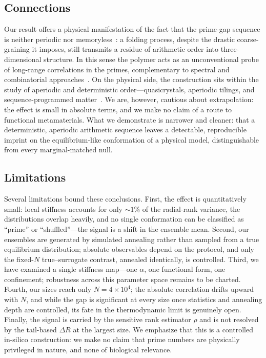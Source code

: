 \documentclass[11pt]{article}
\begin{document}
\subsection{Connections}
Our result offers a physical manifestation of the fact that the prime-gap sequence is
neither periodic nor memoryless~\cite{HardyWright,HardyLittlewood,AresCastro}: a
folding process, despite the drastic coarse-graining it imposes, still transmits a
residue of arithmetic order into three-dimensional structure. In this sense the
polymer acts as an unconventional probe of long-range correlations in the primes,
complementary to spectral and combinatorial approaches~\cite{Montgomery,BerryKeating}.
On the physical side, the construction sits within the study of aperiodic and
deterministic order---quasicrystals, aperiodic tilings, and sequence-programmed
matter~\cite{Shechtman,Levine,Macia}. We are, however, cautious about extrapolation:
the effect is small in absolute terms, and we make no claim of a route to functional
metamaterials. What we demonstrate is narrower and cleaner: that a deterministic,
aperiodic arithmetic sequence leaves a detectable, reproducible imprint on the
equilibrium-like conformation of a physical model, distinguishable from every
marginal-matched null.

\subsection{Limitations}
Several limitations bound these conclusions. First, the effect is quantitatively
small: local stiffness accounts for only $\sim\!1\%$ of the radial-rank variance, the
distributions overlap heavily, and no single conformation can be classified as
``prime'' or ``shuffled''---the signal is a shift in the ensemble mean. Second, our
ensembles are generated by simulated annealing rather than sampled from a true
equilibrium distribution; absolute observables depend on the protocol, and only the
fixed-$N$ true--surrogate contrast, annealed identically, is controlled. Third, we
have examined a single stiffness map---one $\alpha$, one functional form, one
confinement; robustness across this parameter space remains to be charted. Fourth, our
sizes reach only $N = 4\times10^4$; the absolute correlation drifts upward with $N$,
and while the gap is significant at every size once statistics and annealing depth are
controlled, its fate in the thermodynamic limit is genuinely open. Finally, the signal
is carried by the sensitive rank estimator $\rho$ and is not resolved by the tail-based
$\Delta R$ at the largest size. We emphasize that this is a controlled in-silico
construction: we make no claim that prime numbers are physically privileged in nature,
and none of biological relevance.
\end{document}
